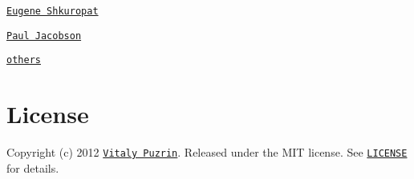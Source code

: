 \begin{DoxyItemize}
\item \href{https://github.com/shkuropat}{\tt Eugene Shkuropat}
\item \href{https://github.com/hpaulj}{\tt Paul Jacobson}
\end{DoxyItemize}

\href{https://github.com/nodeca/argparse/graphs/contributors}{\tt others}

\section*{License }

Copyright (c) 2012 \href{https://github.com/puzrin}{\tt Vitaly Puzrin}. Released under the M\+I\+T license. See \href{https://github.com/nodeca/argparse/blob/master/LICENSE}{\tt L\+I\+C\+E\+N\+S\+E} for details. 